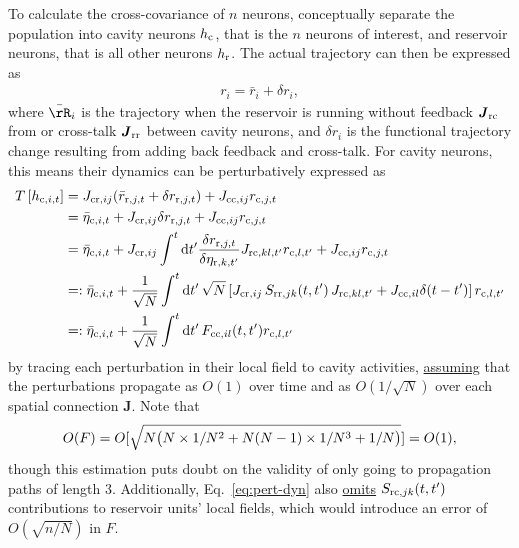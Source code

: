 \documentclass[11pt,openany,oneside]{article} %
\renewcommand{\d}{\mathrm{d}}
\newcommand{\phd}[1]{\left\lbrack {#1}\right\rbrack}\newcommand{\mphd}[1]{\lbrack {#1}\rbrack}\newcommand{\lphd}[1]{\left\lbrack {#1}\right.}\newcommand{\rphd}[1]{\left. {#1}\right\rbrack}%
\newcommand{\bd}[1]{\boldsymbol{#1}}%
\begin{document}
To calculate the cross-covariance of $n$ neurons, conceptually separate the population into cavity
neurons $h_{\text{c}}$, that is the $n$ neurons of interest, and reservoir neurons, that is all other
neurons $h_{\text{r}}$.  The actual trajectory can then be expressed as 
\begin{align*}
  r_i = \bar{r}_i + \delta r_i,
\end{align*}
where $\bar{\rR}_i$ is the trajectory when the reservoir is running without feedback
$\bd{J}_{\rrt\cct}$ from or cross-talk $\bd{J}_{\rrt\rrt}$ between cavity neurons, and $\delta r_i$
is the functional trajectory change resulting from adding back feedback and cross-talk.  For cavity
neurons, this means their dynamics can be perturbatively expressed as
\begin{equation}
  \label{eq:pert-dyn}
  \begin{aligned}
      T\phd{h_{\cct,i,t}} &=J_{\cct\rrt,ij}(\bar{r}_{\rrt, j,t} + \delta r_{\rrt, j,t}) + J_{\cct\cct,ij}r_{\cct, j,t}\\
  &=\bar{\eta}_{\cct, i,t} + J_{\cct\rrt,ij}\delta r_{\rrt, j,t} + J_{\cct\cct,ij}r_{\cct, j,t}\\
  &=\bar{\eta}_{\cct, i,t} + J_{\cct\rrt,ij}\int^t\d t'\frac{\delta r_{\rrt, j,t}}{\delta \eta_{\rrt, k,t'}}J_{\rrt\cct, kl,t'} r_{\cct,l,t'} + J_{\cct\cct,ij}r_{\cct, j,t}\\
  &=:\bar{\eta}_{\cct, i,t} + \frac{1}{\sqrt{N}}\int^t\d t'\,\sqrt{N}\phd{J_{\cct\rrt,ij}\,S_{\rrt\rrt,jk}(t,t')\,J_{\rrt\cct, kl,t'}+J_{\cct\cct,il}\delta(t-t')} r_{\cct,l,t'}\\
  &=:\bar{\eta}_{\cct, i,t} + \frac{1}{\sqrt{N}}\int^t\d t'\,F_{\cct\cct,il}(t,t') r_{\cct,l,t'}
  \end{aligned}
\end{equation}
by tracing each perturbation in their local field to cavity activities, \uline{assuming} that the
perturbations propagate as $O(1)$ over time and as $O(1/\sqrt{N})$ over each spatial connection
$\bd{J}$.  Note that
\begin{align*}
  O(F) = O\mphd{\sqrt{N\mooo{N\times 1/N^2+N(N-1)\times 1/N^3+1/N}}}=O(1),
\end{align*}
though this estimation puts doubt on the validity of only going to propagation paths of length $3$.
Additionally, Eq.~\ref{eq:pert-dyn} also \uline{omits} $S_{\text{r}\text{c},jk}(t,t')$ contributions to
reservoir units' local fields, which would introduce an error of $O(\sqrt{n/N})$ in $F$.
\end{document}
